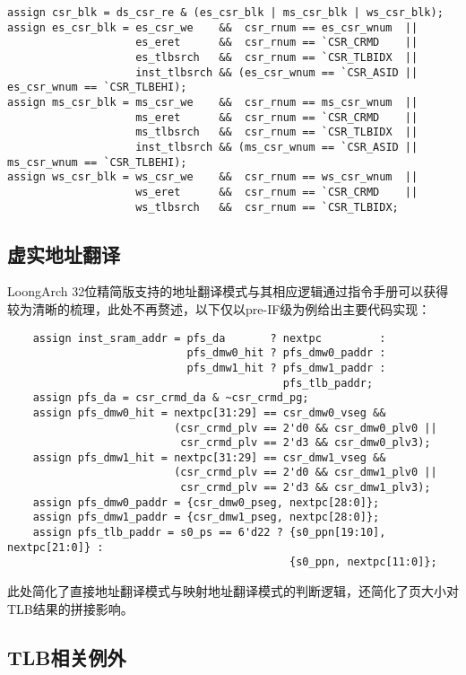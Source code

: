 \documentclass[UTF-8,twoside,c5size]{ctexart}
\begin{document}
    \begin{verbatim}
assign csr_blk = ds_csr_re & (es_csr_blk | ms_csr_blk | ws_csr_blk);
assign es_csr_blk = es_csr_we    &&  csr_rnum == es_csr_wnum  ||
                    es_eret      &&  csr_rnum == `CSR_CRMD    ||
                    es_tlbsrch   &&  csr_rnum == `CSR_TLBIDX  ||
                    inst_tlbsrch && (es_csr_wnum == `CSR_ASID || es_csr_wnum == `CSR_TLBEHI);
assign ms_csr_blk = ms_csr_we    &&  csr_rnum == ms_csr_wnum  ||
                    ms_eret      &&  csr_rnum == `CSR_CRMD    ||
                    ms_tlbsrch   &&  csr_rnum == `CSR_TLBIDX  ||
                    inst_tlbsrch && (ms_csr_wnum == `CSR_ASID || ms_csr_wnum == `CSR_TLBEHI);
assign ws_csr_blk = ws_csr_we    &&  csr_rnum == ws_csr_wnum  ||
                    ws_eret      &&  csr_rnum == `CSR_CRMD    ||
                    ws_tlbsrch   &&  csr_rnum == `CSR_TLBIDX;
    \end{verbatim}
    
    \subsection{虚实地址翻译}
    
    LoongArch 32位精简版支持的地址翻译模式与其相应逻辑通过指令手册可以获得较为清晰的梳理，此处不再赘述，以下仅以pre-IF级为例给出主要代码实现：
    \begin{verbatim}
    assign inst_sram_addr = pfs_da       ? nextpc         :
                            pfs_dmw0_hit ? pfs_dmw0_paddr :
                            pfs_dmw1_hit ? pfs_dmw1_paddr :
                                           pfs_tlb_paddr;
    assign pfs_da = csr_crmd_da & ~csr_crmd_pg;
    assign pfs_dmw0_hit = nextpc[31:29] == csr_dmw0_vseg &&
                          (csr_crmd_plv == 2'd0 && csr_dmw0_plv0 ||
                           csr_crmd_plv == 2'd3 && csr_dmw0_plv3);
    assign pfs_dmw1_hit = nextpc[31:29] == csr_dmw1_vseg &&
                          (csr_crmd_plv == 2'd0 && csr_dmw1_plv0 ||
                           csr_crmd_plv == 2'd3 && csr_dmw1_plv3);
    assign pfs_dmw0_paddr = {csr_dmw0_pseg, nextpc[28:0]};
    assign pfs_dmw1_paddr = {csr_dmw1_pseg, nextpc[28:0]};
    assign pfs_tlb_paddr = s0_ps == 6'd22 ? {s0_ppn[19:10], nextpc[21:0]} :
                                            {s0_ppn, nextpc[11:0]};
    \end{verbatim}
    此处简化了直接地址翻译模式与映射地址翻译模式的判断逻辑，还简化了页大小对TLB结果的拼接影响。
    
    \subsection{\textbf{TLB}相关例外}
    
\end{document}
